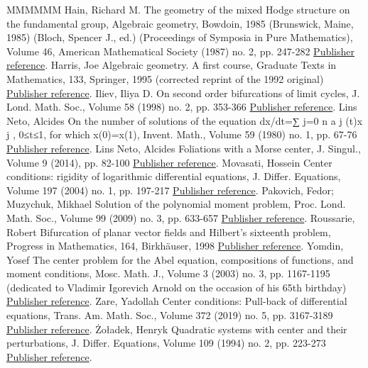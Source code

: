 \documentclass[11pt]{article}
\theoremstyle{definition}
\numberwithin{equation}{section}
\numberwithin{figure}{section}
\numberwithin{table}{section}
\begin{document}
\begin{thebibliography}{MMMMMM}
 Hain, Richard M. The geometry of the mixed Hodge structure on the fundamental group, Algebraic geometry, Bowdoin, 1985 (Brunswick, Maine, 1985) (Bloch, Spencer J., ed.) (Proceedings of Symposia in Pure Mathematics), Volume 46, American Mathematical Society (1987) no. 2, pp. 247-282 \href{https://ahl.centre-mersenne.org/item/AHL_2020__3__615_0/#hain87}{Publisher reference}.
 Harris, Joe Algebraic geometry. A first course, Graduate Texts in Mathematics, 133, Springer, 1995 (corrected reprint of the 1992 original) \href{https://ahl.centre-mersenne.org/item/AHL_2020__3__615_0/#harr95}{Publisher reference}.
 Iliev, Iliya D. On second order bifurcations of limit cycles, J. Lond. Math. Soc., Volume 58 (1998) no. 2, pp. 353-366 \href{https://ahl.centre-mersenne.org/item/AHL_2020__3__615_0/#ilie98a}{Publisher reference}.
 Lins Neto, Alcides On the number of solutions of the equation dx/dt=∑ j=0 n a j (t)x j , 0≤t≤1, for which x(0)=x(1), Invent. Math., Volume 59 (1980) no. 1, pp. 67-76 \href{https://ahl.centre-mersenne.org/item/AHL_2020__3__615_0/#lins80}{Publisher reference}.
 Lins Neto, Alcides Foliations with a Morse center, J. Singul., Volume 9 (2014), pp. 82-100 \href{https://ahl.centre-mersenne.org/item/AHL_2020__3__615_0/#lins14}{Publisher reference}.
 Movasati, Hossein Center conditions: rigidity of logarithmic differential equations, J. Differ. Equations, Volume 197 (2004) no. 1, pp. 197-217 \href{https://ahl.centre-mersenne.org/item/AHL_2020__3__615_0/#mova04}{Publisher reference}.
 Pakovich, Fedor; Muzychuk, Mikhael Solution of the polynomial moment problem, Proc. Lond. Math. Soc., Volume 99 (2009) no. 3, pp. 633-657 \href{https://ahl.centre-mersenne.org/item/AHL_2020__3__615_0/#pamu09}{Publisher reference}.
 Roussarie, Robert Bifurcation of planar vector fields and Hilbert’s sixteenth problem, Progress in Mathematics, 164, Birkhäuser, 1998 \href{https://ahl.centre-mersenne.org/item/AHL_2020__3__615_0/#rous98}{Publisher reference}.
 Yomdin, Yosef The center problem for the Abel equation, compositions of functions, and moment conditions, Mosc. Math. J., Volume 3 (2003) no. 3, pp. 1167-1195 (dedicated to Vladimir Igorevich Arnold on the occasion of his 65th birthday) \href{https://ahl.centre-mersenne.org/item/AHL_2020__3__615_0/#yomd03}{Publisher reference}.
 Zare, Yadollah Center conditions: Pull-back of differential equations, Trans. Am. Math. Soc., Volume 372 (2019) no. 5, pp. 3167-3189 \href{https://ahl.centre-mersenne.org/item/AHL_2020__3__615_0/#zare19}{Publisher reference}.
 Żoładek, Henryk Quadratic systems with center and their perturbations, J. Differ. Equations, Volume 109 (1994) no. 2, pp. 223-273 \href{https://ahl.centre-mersenne.org/item/AHL_2020__3__615_0/#zola94}{Publisher reference}.
\end{thebibliography}
\end{document}
